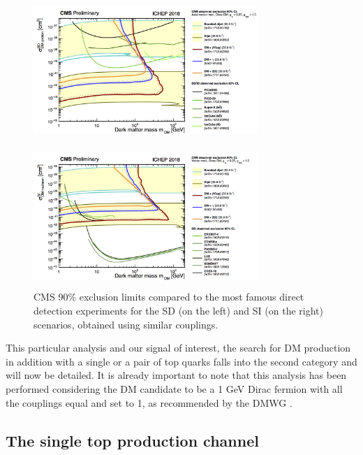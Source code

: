\documentclass[a4paper, 10pt, openright]{report}
\begin{document}
\begin{figure}[htbp]
\centering
\begin{minipage}[b]{.47\textwidth}
\includegraphics[width=8.5cm, height=5.4cm]{figs/SDDD.png}
\end{minipage}\hfill
\begin{minipage}[b]{.47\textwidth}
\includegraphics[width=8.5cm, height=5.4cm]{figs/SIDD.png}
\end{minipage} \hfill
\caption{\ac{CMS} 90\% exclusion limits compared to the most famous direct detection experiments for the \ac{SD} (on the left) and \ac{SI} (on the right) scenarios, obtained using similar couplings.}
\label{fig:DDComparison}
\end{figure}

This particular analysis and our signal of interest, the search for \ac{DM} production in addition with a single or a pair of top quarks falls into the second category and will now be detailed. It is already important to note that this analysis has been performed considering the \ac{DM} candidate to be a 1 GeV Dirac fermion with all the couplings equal and set to 1, as recommended by the \ac{DMWG} \cite{DMWG}.

\subsection{The single top production channel} \label{subsection:singleTopChannel}
\end{document}
